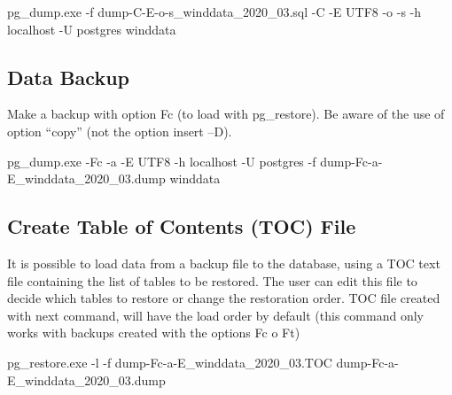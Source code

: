 \documentclass[12pt,oneside]{reedthesis}
\newenvironment{Shaded}{\begin{snugshade}}{\end{snugshade}}
\newcommand{\ExtensionTok}[1]{#1}
\newcommand{\NormalTok}[1]{#1}
\begin{document}
\vspace{0.4cm}
\begin{Shaded}
\begin{Highlighting}[]
      \ExtensionTok{pg_dump.exe}\NormalTok{ -f dump-C-E-o-s_winddata_2020_03.sql -C -E UTF8 -o -s -h localhost -U postgres winddata}
\end{Highlighting}
\end{Shaded}
\normalsize

\hypertarget{data-backup}{%
\subsection{Data Backup}\label{data-backup}}

Make a backup with option Fc (to load with pg\_restore). Be aware of the use of option ``copy'' (not the option insert --D).

\scriptsize

\vspace{0.4cm}
\begin{Shaded}
\begin{Highlighting}[]
      \ExtensionTok{pg_dump.exe}\NormalTok{ -Fc -a -E UTF8 -h localhost -U postgres -f dump-Fc-a-E_winddata_2020_03.dump winddata}
\end{Highlighting}
\end{Shaded}
\normalsize

\hypertarget{create-table-of-contents-toc-file}{%
\subsection{Create Table of Contents (TOC) File}\label{create-table-of-contents-toc-file}}

It is possible to load data from a backup file to the database, using a TOC text file containing the list of tables to be restored. The user can edit this file to decide which tables to restore or change the restoration order. TOC file created with next command, will have the load order by default (this command only works with backups created with the options Fc o Ft)

\scriptsize

\vspace{0.4cm}
\begin{Shaded}
\begin{Highlighting}[]
      \ExtensionTok{pg_restore.exe}\NormalTok{ -l -f dump-Fc-a-E_winddata_2020_03.TOC dump-Fc-a-E_winddata_2020_03.dump}
\end{Highlighting}
\end{Shaded}
\normalsize
\end{document}
